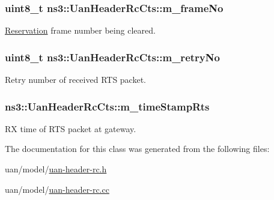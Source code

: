 \subsubsection[{\texorpdfstring{m\+\_\+frame\+No}{m_frameNo}}]{\setlength{\rightskip}{0pt plus 5cm}uint8\+\_\+t ns3\+::\+Uan\+Header\+Rc\+Cts\+::m\+\_\+frame\+No\hspace{0.3cm}{\ttfamily [private]}}\hypertarget{classns3_1_1UanHeaderRcCts_ab62bcb06362259f4357383cf2d2b3c86}{}\label{classns3_1_1UanHeaderRcCts_ab62bcb06362259f4357383cf2d2b3c86}


\hyperlink{classns3_1_1Reservation}{Reservation} frame number being cleared. 

\subsubsection[{\texorpdfstring{m\+\_\+retry\+No}{m_retryNo}}]{\setlength{\rightskip}{0pt plus 5cm}uint8\+\_\+t ns3\+::\+Uan\+Header\+Rc\+Cts\+::m\+\_\+retry\+No\hspace{0.3cm}{\ttfamily [private]}}\hypertarget{classns3_1_1UanHeaderRcCts_af4a8c1b06a2bc4607495a57e827e8d40}{}\label{classns3_1_1UanHeaderRcCts_af4a8c1b06a2bc4607495a57e827e8d40}


Retry number of received R\+TS packet. 

\subsubsection[{\texorpdfstring{m\+\_\+time\+Stamp\+Rts}{m_timeStampRts}}]{ ns3\+::\+Uan\+Header\+Rc\+Cts\+::m\+\_\+time\+Stamp\+Rts\hspace{0.3cm}{\ttfamily [private]}}\hypertarget{classns3_1_1UanHeaderRcCts_a8eaa740a99d0177683659baadcc54627}{}\label{classns3_1_1UanHeaderRcCts_a8eaa740a99d0177683659baadcc54627}


RX time of R\+TS packet at gateway. 



The documentation for this class was generated from the following files\+:\begin{DoxyCompactItemize}
\item 
uan/model/\hyperlink{uan-header-rc_8h}{uan-\/header-\/rc.\+h}\item 
uan/model/\hyperlink{uan-header-rc_8cc}{uan-\/header-\/rc.\+cc}\end{DoxyCompactItemize}

